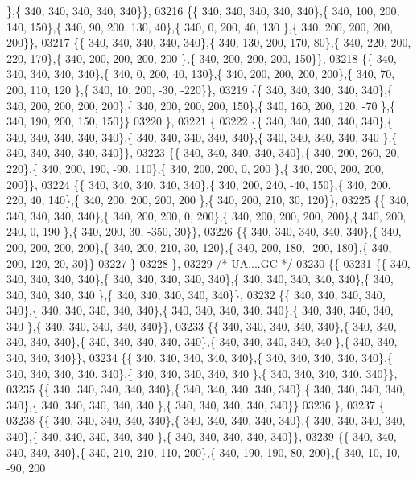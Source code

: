 \begin{DoxyCode}
      \},\{ 340, 340, 340, 340, 340\}\},
03216 \{\{ 340, 340, 340, 340, 340\},\{ 340, 100, 200, 140, 150\},\{ 340,  90, 200, 130,  40\},\{ 340,   0, 200,  40, 130
      \},\{ 340, 200, 200, 200, 200\}\},
03217 \{\{ 340, 340, 340, 340, 340\},\{ 340, 130, 200, 170,  80\},\{ 340, 220, 200, 220, 170\},\{ 340, 200, 200, 200, 200
      \},\{ 340, 200, 200, 200, 150\}\},
03218 \{\{ 340, 340, 340, 340, 340\},\{ 340,   0, 200,  40, 130\},\{ 340, 200, 200, 200, 200\},\{ 340,  70, 200, 110, 120
      \},\{ 340,  10, 200, -30, -220\}\},
03219 \{\{ 340, 340, 340, 340, 340\},\{ 340, 200, 200, 200, 200\},\{ 340, 200, 200, 200, 150\},\{ 340, 160, 200, 120, -70
      \},\{ 340, 190, 200, 150, 150\}\}
03220 \},
03221 \{
03222 \{\{ 340, 340, 340, 340, 340\},\{ 340, 340, 340, 340, 340\},\{ 340, 340, 340, 340, 340\},\{ 340, 340, 340, 340, 340
      \},\{ 340, 340, 340, 340, 340\}\},
03223 \{\{ 340, 340, 340, 340, 340\},\{ 340, 200, 260,  20, 220\},\{ 340, 200, 190, -90, 110\},\{ 340, 200, 200,   0, 200
      \},\{ 340, 200, 200, 200, 200\}\},
03224 \{\{ 340, 340, 340, 340, 340\},\{ 340, 200, 240, -40, 150\},\{ 340, 200, 220,  40, 140\},\{ 340, 200, 200, 200, 200
      \},\{ 340, 200, 210,  30, 120\}\},
03225 \{\{ 340, 340, 340, 340, 340\},\{ 340, 200, 200,   0, 200\},\{ 340, 200, 200, 200, 200\},\{ 340, 200, 240,   0, 190
      \},\{ 340, 200,  30, -350,  30\}\},
03226 \{\{ 340, 340, 340, 340, 340\},\{ 340, 200, 200, 200, 200\},\{ 340, 200, 210,  30, 120\},\{ 340, 200, 180, -200, 
      180\},\{ 340, 200, 120,  20,  30\}\}
03227 \}
03228 \},
03229 \textcolor{comment}{/* UA....GC */}
03230 \{\{
03231 \{\{ 340, 340, 340, 340, 340\},\{ 340, 340, 340, 340, 340\},\{ 340, 340, 340, 340, 340\},\{ 340, 340, 340, 340, 340
      \},\{ 340, 340, 340, 340, 340\}\},
03232 \{\{ 340, 340, 340, 340, 340\},\{ 340, 340, 340, 340, 340\},\{ 340, 340, 340, 340, 340\},\{ 340, 340, 340, 340, 340
      \},\{ 340, 340, 340, 340, 340\}\},
03233 \{\{ 340, 340, 340, 340, 340\},\{ 340, 340, 340, 340, 340\},\{ 340, 340, 340, 340, 340\},\{ 340, 340, 340, 340, 340
      \},\{ 340, 340, 340, 340, 340\}\},
03234 \{\{ 340, 340, 340, 340, 340\},\{ 340, 340, 340, 340, 340\},\{ 340, 340, 340, 340, 340\},\{ 340, 340, 340, 340, 340
      \},\{ 340, 340, 340, 340, 340\}\},
03235 \{\{ 340, 340, 340, 340, 340\},\{ 340, 340, 340, 340, 340\},\{ 340, 340, 340, 340, 340\},\{ 340, 340, 340, 340, 340
      \},\{ 340, 340, 340, 340, 340\}\}
03236 \},
03237 \{
03238 \{\{ 340, 340, 340, 340, 340\},\{ 340, 340, 340, 340, 340\},\{ 340, 340, 340, 340, 340\},\{ 340, 340, 340, 340, 340
      \},\{ 340, 340, 340, 340, 340\}\},
03239 \{\{ 340, 340, 340, 340, 340\},\{ 340, 210, 210, 110, 200\},\{ 340, 190, 190,  80, 200\},\{ 340,  10,  10, -90, 200

\end{DoxyCode}

